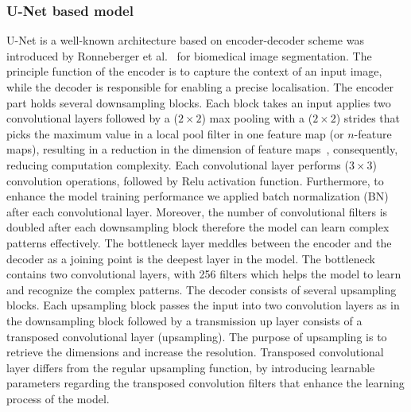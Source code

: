 \subsubsection{U-Net based model}
U-Net is a well-known architecture based on encoder-decoder scheme was introduced by Ronneberger et al.~\cite{Ronneberger2015} for biomedical image segmentation. 
The principle function of the encoder is to capture the context of an input image, while the decoder is responsible for enabling a precise localisation. 
The encoder part holds several downsampling blocks. 
Each block takes an input applies two convolutional layers followed by a (\(2\times2\)) max pooling with a (\(2\times2\)) strides that picks the maximum value in a local pool filter in one feature map (or \(n\)-feature maps), resulting in a reduction in the dimension of feature maps~\cite{Lecun2015}, consequently, reducing computation complexity.
Each convolutional layer performs (\(3\times3\)) convolution operations, followed by Relu activation function.
Furthermore, to enhance the model training performance we applied batch normalization (BN)~\cite{Ioffe2015} after each convolutional layer.
Moreover, the number of convolutional filters is doubled after each downsampling block therefore the model can learn complex patterns effectively. 
The bottleneck layer meddles between the encoder and the decoder as a joining point is the deepest layer in the model.
The bottleneck contains two convolutional layers, with 256 filters which helps the model to learn and recognize the complex patterns.
The decoder consists of several upsampling blocks. 
Each upsampling block passes the input into two convolution layers as in the downsampling block followed by a transmission up layer consists of a transposed convolutional layer (upsampling). 
The purpose of upsampling is to retrieve the dimensions and increase the resolution.
Transposed convolutional layer differs from the regular upsampling function, by introducing learnable parameters regarding the transposed convolution filters that enhance the learning process of the model. 
